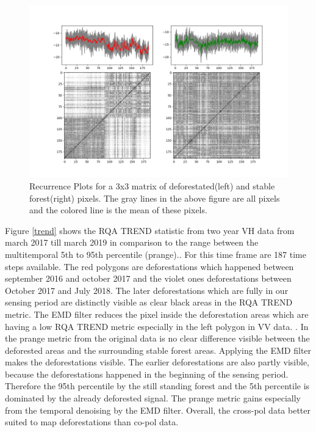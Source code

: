 \documentclass{article}
\begin{document}
\begin{figure}
  \includegraphics[width=\textwidth]{figs/S1_Hidalgo_timestack_20km_VH___lin_20_test_tandemdem12_rp_deffor_3.png}
  \caption{Recurrence Plots for a 3x3 matrix of deforestated(left) and stable forest(right) pixels.
           The gray lines in the above figure are all pixels and the colored line is the mean of these pixels.}
  \label{rpforest}
\end{figure}

Figure \ref{trend} shows the RQA TREND statistic from two year VH data from march 2017 till march 2019 in comparison to the range between the multitemporal 5th to 95th percentile (prange)..
For this time frame are 187 time steps available.
The red polygons are deforestations which happened between september 2016 and october 2017 and the violet ones deforestations between October 2017 and July 2018.
The later deforestations which are fully in our sensing period are distinctly visible as clear black areas in the RQA TREND metric. 
The EMD filter reduces the pixel inside the deforestation areas which are having a low RQA TREND metric especially in the left polygon in VV data. . 
In the prange metric from the original data is no clear difference visible between the deforested areas and the surrounding stable forest areas. 
Applying the EMD filter makes the deforestations visible.
The earlier deforestations are also partly visible, because the deforestations happened in the beginning of the sensing period.
Therefore the 95th percentile by the still standing forest and the 5th percentile is dominated by the already deforested signal.
The prange metric gains especially from the temporal denoising by the EMD filter. 
Overall, the cross-pol data better suited to map deforestations than co-pol data.
\end{document}
